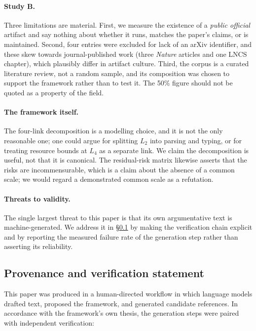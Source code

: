 \documentclass[11pt,a4paper]{article}
\begin{document}
\paragraph{Study B.} Three limitations are material. First, we measure the
existence of a \emph{public official} artifact and say nothing about whether it
runs, matches the paper's claims, or is maintained. Second, four entries were
excluded for lack of an arXiv identifier, and these skew towards
journal-published work (three \emph{Nature} articles and one LNCS chapter),
which plausibly differ in artifact culture. Third, the corpus is a curated
literature review, not a random sample, and its composition was chosen to
support the framework rather than to test it. The 50\% figure should not be
quoted as a property of the field.

\paragraph{The framework itself.} The four-link decomposition is a modelling
choice, and it is not the only reasonable one; one could argue for splitting
$L_2$ into parsing and typing, or for treating resource bounds at $L_4$ as a
separate link. We claim the decomposition is useful, not that it is canonical.
The residual-risk matrix likewise asserts that the risks are incommensurable,
which is a claim about the absence of a common scale; we would regard a
demonstrated common scale as a refutation.

\paragraph{Threats to validity.} The single largest threat to this paper is
that its own argumentative text is machine-generated. We address it in
\S\ref{sec:provenance} by making the verification chain explicit and by
reporting the measured failure rate of the generation step rather than
asserting its reliability.

\subsection{Provenance and verification statement}
\label{sec:provenance}

This paper was produced in a human-directed workflow in which language models
drafted text, proposed the framework, and generated candidate references. In
accordance with the framework's own thesis, the generation steps were paired
with independent verification:
\end{document}
